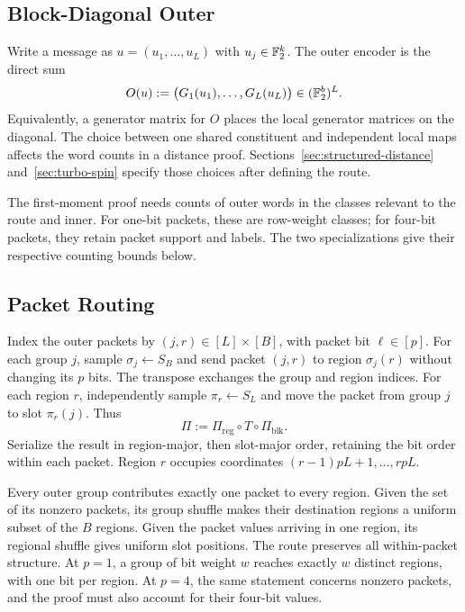 \subsection{Block-Diagonal Outer}

Write a message as $u=(u_1,\ldots,u_L)$ with
$u_j\in\mathbb F_2^k$. The outer encoder is the direct sum
\begin{equation}
  O(u)
  :=
  \bigl(G_1(u_1),\ldots,G_L(u_L)\bigr)
  \in(\mathbb F_2^b)^L.
  \label{eq:structured-outer}
\end{equation}
Equivalently, a generator matrix for $O$ places the local generator matrices
on the diagonal. The choice between one shared constituent and independent
local maps affects the word counts in a distance proof. Sections~\ref{sec:structured-distance}
and~\ref{sec:turbo-spin} specify those choices after defining the route.

The first-moment proof needs counts of outer words in the classes relevant
to the route and inner. For one-bit packets, these are row-weight classes;
for four-bit packets, they retain packet support and labels. The two
specializations give their respective counting bounds below.
\subsection{Packet Routing}

Index the outer packets by $(j,r)\in[L]\times[B]$, with packet bit
$\ell\in[p]$. For each group $j$, sample $\sigma_j\gets S_B$ and send
packet $(j,r)$ to region $\sigma_j(r)$ without changing its $p$ bits.
The transpose exchanges the group and region indices. For each region
$r$, independently sample $\pi_r\gets S_L$ and move the packet from
group $j$ to slot $\pi_r(j)$. Thus
\begin{equation}
 \Pi:=\Pi_{\mathrm{reg}}\circ T\circ\Pi_{\mathrm{blk}}.
 \label{eq:structured-interleaver}
\end{equation}
Serialize the result in region-major, then slot-major order, retaining
the bit order within each packet. Region $r$ occupies coordinates
$(r-1)pL+1,\ldots,rpL$.

Every outer group contributes exactly one packet to every region. Given
the set of its nonzero packets, its group shuffle makes their destination
regions a uniform subset of the $B$ regions. Given the packet values
arriving in one region, its regional shuffle gives uniform slot positions.
The route preserves all within-packet structure. At $p=1$, a group of
bit weight $w$ reaches exactly $w$ distinct regions, with one bit per
region. At $p=4$, the same statement concerns nonzero packets, and the
proof must also account for their four-bit values.

